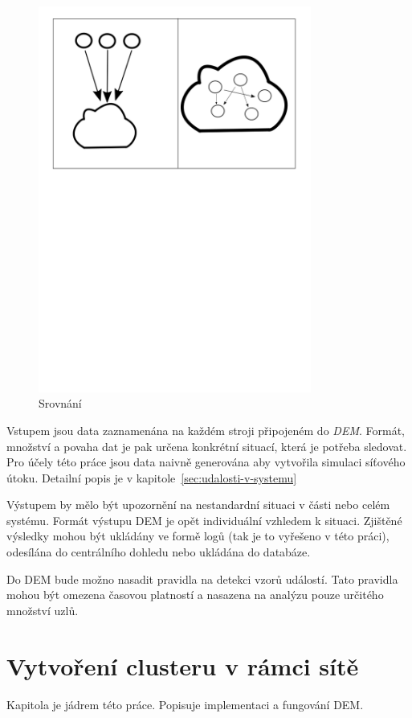\documentclass[
  digital, %
  table,   %
  nolof,     %
  nolot,     %
  twoside,
  nocover,
  monochrome,
  12pt
]{fithesis3}
\begin{document}
\begin{figure}[h]
	\centering
    \includegraphics[width=0.8\textwidth, height=0.55\textheight]{images/cloud-comparison.png}
    \caption{Srovnání}
    \label{fig:cloud-comparison}
\end{figure}

Vstupem jsou data zaznamenána na každém stroji připojeném do \textit{DEM}. Formát, množství a povaha dat je pak určena konkrétní situací, která je potřeba sledovat. Pro účely této práce jsou data naivně generována aby vytvořila simulaci síťového útoku. Detailní popis je v kapitole~\ref{sec:udalosti-v-systemu}

Výstupem by mělo být upozornění na nestandardní situaci v části nebo celém systému. Formát výstupu DEM je opět individuální vzhledem k situaci. Zjištěné výsledky mohou být ukládány ve formě logů (tak je to vyřešeno v této práci), odesílána do centrálního dohledu nebo ukládána do databáze.

Do DEM bude možno nasadit pravidla na detekci vzorů událostí. Tato pravidla mohou být omezena časovou platností a nasazena na analýzu pouze určitého množství uzlů.

\chapter{Vytvoření clusteru v rámci sítě}
Kapitola je jádrem této práce. Popisuje implementaci a fungování DEM.
\end{document}
